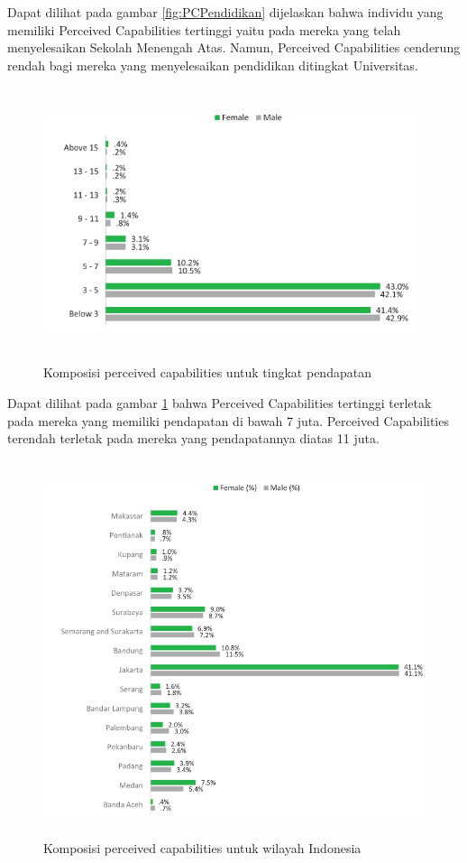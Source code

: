 \begin{enumerate}
Dapat dilihat pada gambar \ref{fig:PCPendidikan} dijelaskan bahwa individu yang memiliki Perceived Capabilities tertinggi yaitu pada mereka yang telah menyelesaikan Sekolah Menengah Atas. Namun, Perceived Capabilities cenderung rendah bagi mereka yang menyelesaikan pendidikan ditingkat Universitas.

\begin{figure} [H]
	\centering  
	\includegraphics[width=11cm, height=8cm]{pendapatanPC2013} 
	\caption[Komposisi perceived capabilities untuk tingkat pendapatan]{Komposisi perceived capabilities untuk tingkat pendapatan} 
	\label{fig:PCPendapatan} 
\end{figure}


Dapat dilihat pada gambar \ref{fig:PCPendapatan} bahwa Perceived Capabilities tertinggi terletak pada mereka yang memiliki pendapatan di bawah 7 juta. Perceived Capabilities terendah terletak pada mereka yang pendapatannya diatas 11 juta.


\begin{figure} [H]
	\centering  
	\includegraphics[width=12cm, height=11cm]{lokasiPC2013} 
	\caption[Komposisi perceived capabilities untuk wilayah Indonesia]{Komposisi perceived capabilities untuk wilayah Indonesia} 
	\label{fig:PCRegion} 
\end{figure}



\end{enumerate}

